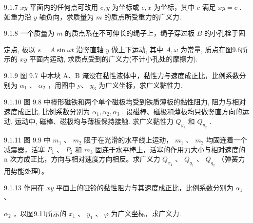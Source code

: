 \begin{problem}{9.1.7}
$xy$ 平面内的任何点可改用 $c, y$ 为坐标或 $c, x$ 为坐标，其中 $c$ 满足 $xy = c$ . 如重力沿 $y$ 轴负向，求质量为 $m$ 的质点所受重力的广义力.
\end{problem}
\clearpage


\begin{problem}{9.1.8}
一个质量为 $m$ 的质点系在不可伸长的绳子上，绳子穿过板 $B$ 的小孔栓于固

定点, 板以 $s = A \sin \omega t$ 沿竖直轴 $y$ 做上下运动, 其中 $A, \omega$ 为常量, 质点在图9.6所示的 $xy$ 平面内运动, 求质点受到的广义力(不计小孔处的摩擦力).
\begin{center}

\end{center}
\end{problem}
\clearpage


\begin{problem}{9.1.9}
图 9.7 中木块 A、B 淹没在黏性液体中，黏性力与速度成正比，比例系数分别为 $\alpha_{1}$ 、 $\alpha_{2}$ ，用图中 y、 $y_{3}$ 为广义坐标，求广义黏性力.
\begin{center}

\end{center}
\end{problem}
\clearpage


\begin{problem}{9.1.10}
图 9.8 中棒形磁铁和两个单个磁极均受到铁质薄板的黏性阻力, 阻力与相对速度成正比, 比例系数分别为 $\alpha_{1}, \alpha_{2}, \alpha_{3}$ . 设磁棒、磁极和薄板均只做竖直方向的运动, 运动中, 磁棒、磁极均与薄板保持接触. 求广义黏性力 $Q_{y_{1}}$ 和 $Q_{y_{2}}$ .
\begin{center}

\end{center}
\end{problem}
\clearpage


\begin{problem}{9.1.11}
图 9.9 中 $m_{1}$ 、 $m_{2}$ 限于在光滑的水平线上运动， $m_{1}$ 、 $m_{2}$ 均固连着一个减震器，活塞 $P_{1}$ 、 $P_{2}$ 和 $m_{3}$ 固连于水平棒上，活塞的作用力大小与相对速度的 n 次方成正比，方向与相对速度方向相反。求广义力 $Q_{x_{1}}$ 、 $Q_{q_{1}}$ 、 $Q_{q_{2}}$ （弹簧力用势能处理）。
\begin{center}

\end{center}
\end{problem}
\clearpage


\begin{problem}{9.1.13}
作用在 $xy$ 平面上的哑铃的黏性阻力与其速度成正比，比例系数分别为 $\alpha_{1}$ 、

$\alpha_{2}$ ，以图9.11所示的 $x_{1}$ 、 $y_{1}$ 、 $\varphi$ 为广义坐标，求广义力.
\begin{center}

\end{center}
\end{problem}
\clearpage


